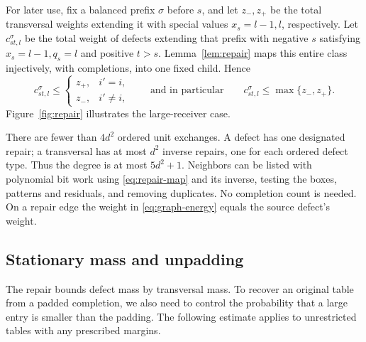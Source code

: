 For later use, fix a balanced prefix $\sigma$ before $s$, and let
$z_-,z_+$ be the total transversal weights extending it with special
values $x_s=l-1,l$, respectively.  Let $c_{st,l}^{\sigma}$ be the total
weight of defects extending that prefix with negative $s$ satisfying
$x_s=l-1,q_s=l$ and positive $t>s$.  Lemma~\ref{lem:repair} maps this
entire class injectively, with completions, into one fixed child.  Hence
\begin{equation}\label{eq:conditional-repair}
 c_{st,l}^{\sigma}\le
 \begin{cases}z_+,&i'=i,\\z_-,&i'\ne i,\end{cases}
 \qquad\text{and in particular}\qquad
 c_{st,l}^{\sigma}\le\max\{z_-,z_+\}.
\end{equation}
Figure~\ref{fig:repair} illustrates the large-receiver case.


There are fewer than $4d^2$ ordered unit exchanges.  A defect has one
designated repair; a transversal has at most $d^2$ inverse repairs,
one for each ordered defect type.  Thus the degree is at most
$5d^2+1$.  Neighbors can be listed with polynomial bit work using
\eqref{eq:repair-map} and its inverse, testing the boxes, patterns and
residuals, and removing duplicates.  No completion count is needed.
On a repair edge the weight in \eqref{eq:graph-energy} equals the
source defect's weight.

\subsection{Stationary mass and unpadding}

The repair bounds defect mass by transversal mass. To recover an original
table from a padded completion, we also need to control the probability
that a large entry is smaller than the padding. The following estimate
applies to unrestricted tables with any prescribed margins.

